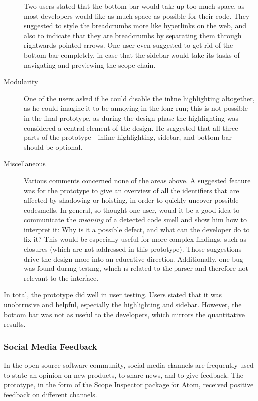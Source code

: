 \begin{description}
Two users stated that the bottom bar would take up too much space, as
most developers would like as much space as possible for their code.
They suggested to style the breadcrumbs more like hyperlinks on the web,
and also to indicate that they are breadcrumbs by separating them
through rightwards pointed arrows. One user even suggested to get rid of
the bottom bar completely, in case that the sidebar would take its tasks
of navigating and previewing the scope chain.
\item[Modularity]
One of the users asked if he could disable the inline highlighting
altogether, as he could imagine it to be annoying in the long run; this
is not possible in the final prototype, as during the design phase the
highlighting was considered a central element of the design. He
suggested that all three parts of the prototype—inline highlighting,
sidebar, and bottom bar—should be optional.
\item[Miscellaneous]
Various comments concerned none of the areas above. A suggested feature
was for the prototype to give an overview of all the identifiers that
are affected by shadowing or hoisting, in order to quickly uncover
possible \glspl{codesmell}. In general, so thought one user, would it be
a good idea to communicate the \emph{meaning} of a detected code smell
and show him how to interpret it: Why is it a possible defect, and what
can the developer do to fix it? This would be especially useful for more
complex findings, such as closures (which are not addressed in this
prototype). Those suggestions drive the design more into an educative
direction. Additionally, one bug was found during testing, which is
related to the parser and therefore not relevant to the interface.
\end{description}

In total, the prototype did well in user testing. Users stated that it
was unobtrusive and helpful, especially the highlighting and sidebar.
However, the bottom bar was not as useful to the developers, which
mirrors the quantitative results.

\subsubsection{Social Media Feedback}\label{social-media-feedback}

In the open source software community, social media channels are
frequently used to state an opinion on new products, to share news, and
to give feedback. The prototype, in the form of the Scope Inspector
package for Atom, received positive feedback on different channels.


